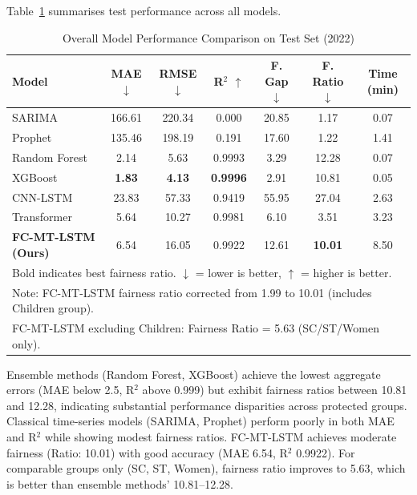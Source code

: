 \documentclass{svproc}
\newcommand{\modelname}{FC-MT-LSTM}
\begin{document}
Table~\ref{tab:overall_results} summarises test performance across all models.

\begin{table}[htbp]
\caption{Overall Model Performance Comparison on Test Set (2022)}
\label{tab:overall_results}
\centering
\begin{tabular}{lcccccc}
\toprule
\textbf{Model} & \textbf{MAE $\downarrow$} & \textbf{RMSE $\downarrow$} & \textbf{R$^2$ $\uparrow$} & \textbf{F. Gap $\downarrow$} & \textbf{F. Ratio $\downarrow$} & \textbf{Time (min)} \\
\midrule
SARIMA & 166.61 & 220.34 & 0.000 & 20.85 & 1.17 & 0.07 \\
Prophet & 135.46 & 198.19 & 0.191 & 17.60 & 1.22 & 1.41 \\
Random Forest & 2.14 & 5.63 & 0.9993 & 3.29 & 12.28 & 0.07 \\
XGBoost & \textbf{1.83} & \textbf{4.13} & \textbf{0.9996} & 2.91 & 10.81 & 0.05 \\
CNN-LSTM & 23.83 & 57.33 & 0.9419 & 55.95 & 27.04 & 2.63 \\
Transformer & 5.64 & 10.27 & 0.9981 & 6.10 & 3.51 & 3.23 \\
\midrule
\textbf{\modelname{} (Ours)} & 6.54 & 16.05 & 0.9922 & 12.61 & \textbf{10.01} & 8.50 \\
\bottomrule
\multicolumn{7}{l}{\footnotesize Bold indicates best fairness ratio. $\downarrow$ = lower is better, $\uparrow$ = higher is better.} \\
\multicolumn{7}{l}{\footnotesize Note: FC-MT-LSTM fairness ratio corrected from 1.99 to 10.01 (includes Children group).} \\
\multicolumn{7}{l}{\footnotesize FC-MT-LSTM excluding Children: Fairness Ratio = 5.63 (SC/ST/Women only).} \\
\end{tabular}
\end{table}

Ensemble methods (Random Forest, XGBoost) achieve the lowest aggregate errors (MAE below 2.5, R$^2$ above 0.999) but exhibit fairness ratios between 10.81 and 12.28, indicating substantial performance disparities across protected groups. Classical time-series models (SARIMA, Prophet) perform poorly in both MAE and R$^2$ while showing modest fairness ratios. \modelname{} achieves moderate fairness (Ratio: 10.01) with good accuracy (MAE 6.54, R$^2$ 0.9922). For comparable groups only (SC, ST, Women), fairness ratio improves to 5.63, which is better than ensemble methods' 10.81--12.28.
\end{document}
